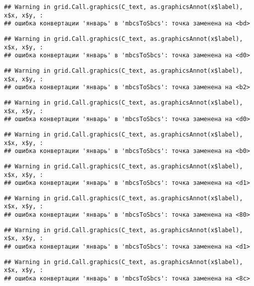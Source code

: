 \documentclass[
]{article}
\begin{document}
\begin{verbatim}
## Warning in grid.Call.graphics(C_text, as.graphicsAnnot(x$label), x$x, x$y, :
## ошибка конвертации 'январь' в 'mbcsToSbcs': точка заменена на <bd>
\end{verbatim}

\begin{verbatim}
## Warning in grid.Call.graphics(C_text, as.graphicsAnnot(x$label), x$x, x$y, :
## ошибка конвертации 'январь' в 'mbcsToSbcs': точка заменена на <d0>
\end{verbatim}

\begin{verbatim}
## Warning in grid.Call.graphics(C_text, as.graphicsAnnot(x$label), x$x, x$y, :
## ошибка конвертации 'январь' в 'mbcsToSbcs': точка заменена на <b2>
\end{verbatim}

\begin{verbatim}
## Warning in grid.Call.graphics(C_text, as.graphicsAnnot(x$label), x$x, x$y, :
## ошибка конвертации 'январь' в 'mbcsToSbcs': точка заменена на <d0>
\end{verbatim}

\begin{verbatim}
## Warning in grid.Call.graphics(C_text, as.graphicsAnnot(x$label), x$x, x$y, :
## ошибка конвертации 'январь' в 'mbcsToSbcs': точка заменена на <b0>
\end{verbatim}

\begin{verbatim}
## Warning in grid.Call.graphics(C_text, as.graphicsAnnot(x$label), x$x, x$y, :
## ошибка конвертации 'январь' в 'mbcsToSbcs': точка заменена на <d1>
\end{verbatim}

\begin{verbatim}
## Warning in grid.Call.graphics(C_text, as.graphicsAnnot(x$label), x$x, x$y, :
## ошибка конвертации 'январь' в 'mbcsToSbcs': точка заменена на <80>
\end{verbatim}

\begin{verbatim}
## Warning in grid.Call.graphics(C_text, as.graphicsAnnot(x$label), x$x, x$y, :
## ошибка конвертации 'январь' в 'mbcsToSbcs': точка заменена на <d1>
\end{verbatim}

\begin{verbatim}
## Warning in grid.Call.graphics(C_text, as.graphicsAnnot(x$label), x$x, x$y, :
## ошибка конвертации 'январь' в 'mbcsToSbcs': точка заменена на <8c>
\end{verbatim}
\end{document}
